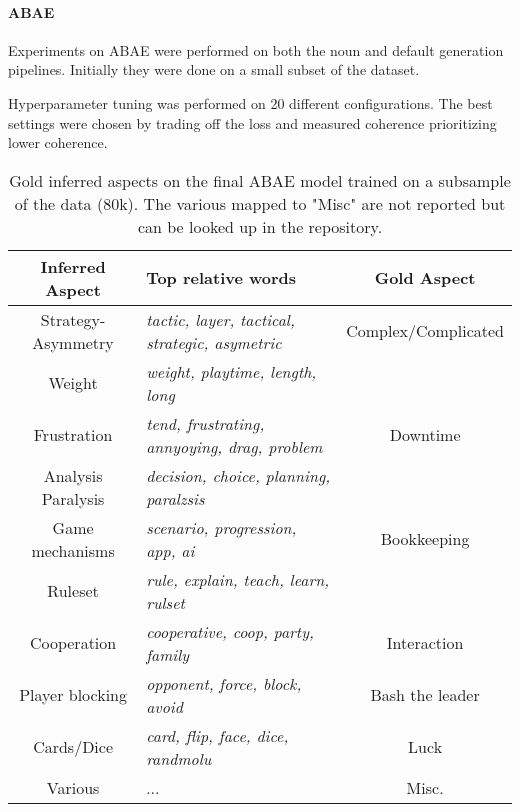 \paragraph{ABAE}
Experiments on ABAE were performed on both the noun and default generation pipelines.
Initially they were done on a small subset of the dataset.

Hyperparameter tuning was performed on 20 different configurations.
The best settings were chosen by trading off the loss and measured coherence prioritizing lower coherence.

\begin{center}
    \begin{table}
        \begin{tabular}{c l c}
            \hline
            Inferred Aspect    & Top relative words                                     & Gold Aspect \\ [0.5ex]
            \hline\hline
            Strategy-Asymmetry & \textit{tactic, layer, tactical, strategic, asymetric} & Complex/Complicated \\
            Weight             & \textit{weight, playtime, length, long}                &                     \\
            \hline
            Frustration        & \textit{tend, frustrating, annyoying, drag, problem}   & Downtime            \\
            Analysis Paralysis & \textit{decision, choice, planning, paralzsis}         &                     \\
            \hline
            Game mechanisms    & \textit{scenario, progression, app, ai}                & Bookkeeping         \\
            Ruleset            & \textit{rule, explain, teach, learn, rulset}           &                     \\
            \hline
            Cooperation        & \textit{cooperative, coop, party, family}              & Interaction         \\
            \hline
            Player blocking    & \textit{opponent, force, block, avoid}                 & Bash the leader     \\
            \hline
            Cards/Dice         & \textit{card, flip, face, dice, randmolu}              & Luck                \\
            \hline
            Various            & ...                                                    & Misc.               \\
            \hline
        \end{tabular}
        \caption{Gold inferred aspects on the final ABAE model trained on a subsample of the data (80k).
        The various mapped to "Misc" are not reported but can be looked up in the repository.
        }
        \label{best-80}
    \end{table}

\end{center}


